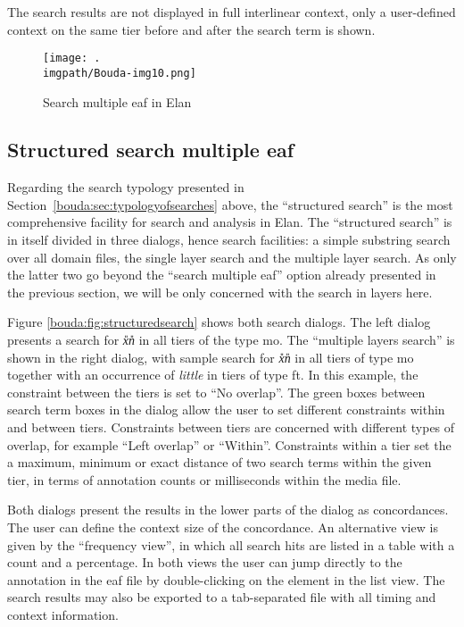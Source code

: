 The search results are not displayed in full interlinear context, only a user-defined context on the same tier before and after the search term is shown.

\begin{figure}
\texttt{[image: .\\imgpath/Bouda-img10.png]}
 \caption{Search multiple eaf in Elan}
\label{bouda:fig:multipleeaf}
\end{figure}



\subsection{Structured search multiple eaf}

Regarding the search typology presented in Section\ \ref{bouda:sec:typologyofsearches} above, the ``structured search'' is the most comprehensive facility for search and analysis in Elan. The ``structured search'' is in itself divided in three dialogs, hence search facilities: a simple substring search over all domain files, the single layer search and the multiple layer search. As only the latter two go beyond the ``search multiple eaf'' option already presented in the previous section, we will be only concerned with the search in layers here.

Figure \ref{bouda:fig:structuredsearch} shows both search dialogs. The left dialog presents a search for \textit{x{\U}n{\U}} in all tiers of the type mo. The ``multiple layers search'' is shown in the right dialog, with sample search for \textit{x{\U}n{\U}} in all tiers of type mo together with an occurrence of \textit{little} in tiers of type ft. In this example, the constraint between the tiers is set to ``No overlap''. The green boxes between search term boxes in the dialog allow the user to set different constraints within and between tiers. Constraints between tiers are concerned with different types of overlap, for example ``Left overlap'' or ``Within''. Constraints within a tier set the a maximum, minimum or exact distance of two search terms within the given tier, in terms of annotation counts or milliseconds within the media file.

 Both dialogs present the results in the lower parts of the dialog as concordances. The user can define the context size of the concordance. An alternative view is given by the ``frequency view'', in which all search hits are listed in a table with a count and a percentage. In both views the user can jump directly to the annotation in the eaf file by double-clicking on the element in the list view. The search results may also be exported to a tab-separated file with all timing and context information.

